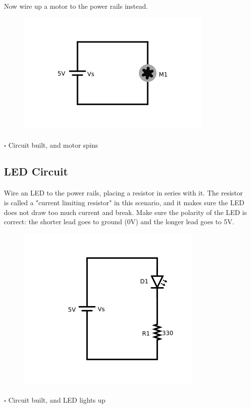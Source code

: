 \documentclass{article}
\begin{document}
\paragraph{}
Now wire up a motor to the power rails instead.
\begin{figure}[H]
  \centering
  \includegraphics[width=0.4\linewidth]{pngs/02-dc-motor.png}
\end{figure}
\paragraph{}
$\square$ Circuit built, and motor spins

\pagebreak
\subsection{LED Circuit}
\paragraph{}
Wire an LED to the power rails, placing a resistor in series with it. The resistor is called a "current limiting resistor" in this scenario, and it makes sure the LED does not draw too much current and break. Make sure the polarity of the LED is correct: the shorter lead goes to ground (0V) and the longer lead goes to 5V.
\begin{figure}[H]
  \centering
  \includegraphics[width=0.4\linewidth]{pngs/03-led.png}
\end{figure}
\paragraph{}
$\square$ Circuit built, and LED lights up
\end{document}
